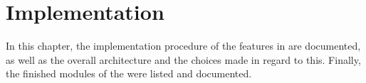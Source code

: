 \chapter{Implementation} \label{cha:implementation}

In this chapter, the implementation procedure of the features in  are documented, as well as the overall architecture and the choices made in regard to this. Finally, the finished modules of the \projname{} were listed and documented.







%
%
%

%
